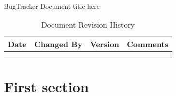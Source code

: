 \documentclass[a4paper]{article}
\newcommand{\appName}{BugTracker}
\begin{document}
    \begin{titlepage}
        \vspace*{\fill}
        \begin{center}
            \huge
            \appName{}
            \vspace{0.4cm}
            \Huge
            Document title here
            \vspace{3cm}
            \begin{table}[h]
                \centering
                \caption{Document Revision History}
                \begin{tabular}{cccc}
                    \hline
                    Date   & Changed By & Version & Comments \\
                    \hline
                    \hfill & \hfill     & \hfill  & \hfill   \\
                    \hfill & \hfill     & \hfill  & \hfill   \\
                    \hline
                \end{tabular}
            \end{table}
        \end{center}
        \vspace*{\fill}
    \end{titlepage}




    \tableofcontents




    \pagebreak
    \section{First section}
\end{document}

